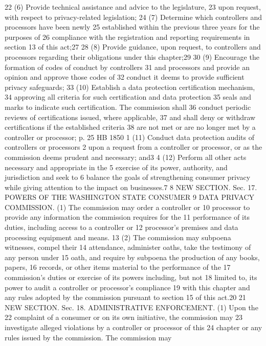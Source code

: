 22 (6) Provide technical assistance and advice to the legislature,
23 upon request, with respect to privacy-related legislation;
24 (7) Determine which controllers and processors have been newly
25 established within the previous three years for the purposes of
26 compliance with the registration and reporting requirements in
section 13 of this act;27
28 (8) Provide guidance, upon request, to controllers and processors
regarding their obligations under this chapter;29
30 (9) Encourage the formation of codes of conduct by controllers
31 and processors and provide an opinion and approve those codes of
32 conduct it deems to provide sufficient privacy safeguards;
33 (10) Establish a data protection certification mechanism,
34 approving all criteria for such certification and data protection
35 seals and marks to indicate such certification. The commission shall
36 conduct periodic reviews of certifications issued, where applicable,
37 and shall deny or withdraw certifications if the established criteria
38 are not met or are no longer met by a controller or processor;
p. 25 HB 1850
1 (11) Conduct data protection audits of controllers or processors
2 upon a request from a controller or processor, or as the commission
deems prudent and necessary; and3
4 (12) Perform all other acts necessary and appropriate in the
5 exercise of its power, authority, and jurisdiction and seek to
6 balance the goals of strengthening consumer privacy while giving
attention to the impact on businesses.7
8 NEW SECTION. Sec. 17. POWERS OF THE WASHINGTON STATE CONSUMER
9 DATA PRIVACY COMMISSION. (1) The commission may order a controller or
10 processor to provide any information the commission requires for the
11 performance of its duties, including access to a controller or
12 processor's premises and data processing equipment and means.
13 (2) The commission may subpoena witnesses, compel their
14 attendance, administer oaths, take the testimony of any person under
15 oath, and require by subpoena the production of any books, papers,
16 records, or other items material to the performance of the
17 commission's duties or exercise of its powers including, but not
18 limited to, its power to audit a controller or processor's compliance
19 with this chapter and any rules adopted by the commission pursuant to
section 15 of this act.20
21 NEW SECTION. Sec. 18. ADMINISTRATIVE ENFORCEMENT. (1) Upon the
22 complaint of a consumer or on its own initiative, the commission may
23 investigate alleged violations by a controller or processor of this
24 chapter or any rules issued by the commission. The commission may
